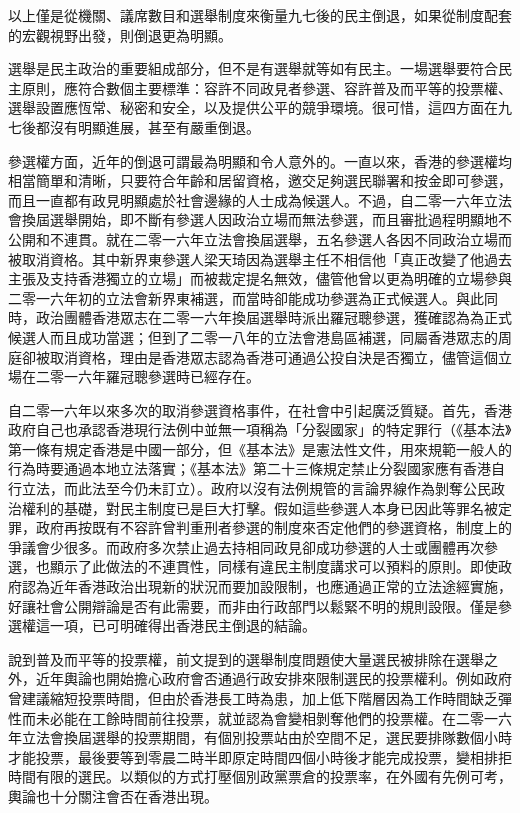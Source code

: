 以上僅是從機關、議席數目和選舉制度來衡量九七後的民主倒退，如果從制度配套的宏觀視野出發，則倒退更為明顯。

選舉是民主政治的重要組成部分，但不是有選舉就等如有民主。一場選舉要符合民主原則，應符合數個主要標準：容許不同政見者參選、容許普及而平等的投票權、選舉設置應恆常、秘密和安全，以及提供公平的競爭環境。很可惜，這四方面在九七後都沒有明顯進展，甚至有嚴重倒退。

參選權方面，近年的倒退可謂最為明顯和令人意外的。一直以來，香港的參選權均相當簡單和清晰，只要符合年齡和居留資格，邀交足夠選民聯署和按金即可參選，而且一直都有政見明顯處於社會邊緣的人士成為候選人。不過，自二零一六年立法會換屆選舉開始，即不斷有參選人因政治立場而無法參選，而且審批過程明顯地不公開和不連貫。就在二零一六年立法會換屆選舉，五名參選人各因不同政治立場而被取消資格。其中新界東參選人梁天琦因為選舉主任不相信他「真正改變了他過去主張及支持香港獨立的立場」而被裁定提名無效，儘管他曾以更為明確的立場參與二零一六年初的立法會新界東補選，而當時卻能成功參選為正式候選人。與此同時，政治團體香港眾志在二零一六年換屆選舉時派出羅冠聰參選，獲確認為為正式候選人而且成功當選；但到了二零一八年的立法會港島區補選，同屬香港眾志的周庭卻被取消資格，理由是香港眾志認為香港可通過公投自決是否獨立，儘管這個立場在二零一六年羅冠聰參選時已經存在。

自二零一六年以來多次的取消參選資格事件，在社會中引起廣泛質疑。首先，香港政府自己也承認香港現行法例中並無一項稱為「分裂國家」的特定罪行（《基本法》第一條有規定香港是中國一部分，但《基本法》是憲法性文件，用來規範一般人的行為時要通過本地立法落實；《基本法》第二十三條規定禁止分裂國家應有香港自行立法，而此法至今仍未訂立）。政府以沒有法例規管的言論界線作為剝奪公民政治權利的基礎，對民主制度已是巨大打擊。假如這些參選人本身已因此等罪名被定罪，政府再按既有不容許曾判重刑者參選的制度來否定他們的參選資格，制度上的爭議會少很多。而政府多次禁止過去持相同政見卻成功參選的人士或團體再次參選，也顯示了此做法的不連貫性，同樣有違民主制度講求可以預料的原則。即使政府認為近年香港政治出現新的狀況而要加設限制，也應通過正常的立法途經實施，好讓社會公開辯論是否有此需要，而非由行政部門以鬆緊不明的規則設限。僅是參選權這一項，已可明確得出香港民主倒退的結論。

說到普及而平等的投票權，前文提到的選舉制度問題使大量選民被排除在選舉之外，近年輿論也開始擔心政府會否通過行政安排來限制選民的投票權利。例如政府曾建議縮短投票時間，但由於香港長工時為患，加上低下階層因為工作時間缺乏彈性而未必能在工餘時間前往投票，就並認為會變相剝奪他們的投票權。在二零一六年立法會換屆選舉的投票期間，有個別投票站由於空間不足，選民要排隊數個小時才能投票，最後要等到零晨二時半即原定時間四個小時後才能完成投票，變相排拒時間有限的選民。以類似的方式打壓個別政黨票倉的投票率，在外國有先例可考，輿論也十分關注會否在香港出現。

